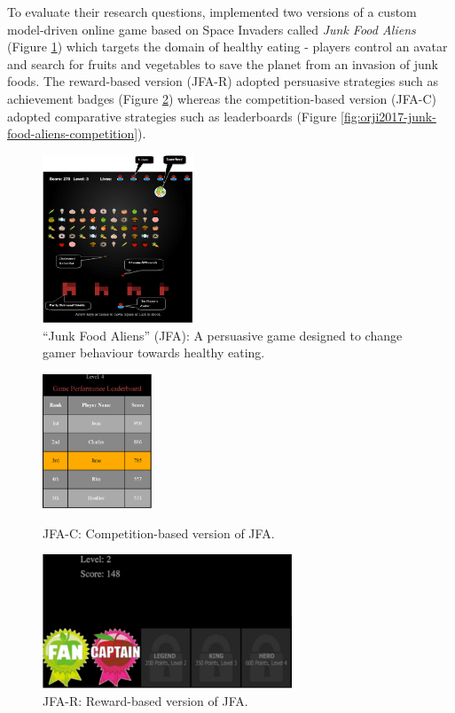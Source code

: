 \documentclass[11pt]{article}
\begin{document}
To evaluate their research questions, \citeauthor{orji2017} implemented two versions of a custom model-driven online game based on Space Invaders called \textit{Junk Food Aliens} (Figure \ref{fig:orji2017-junk-food-aliens}) which targets the domain of healthy eating - players control an avatar and search for fruits and vegetables to save the planet from an invasion of junk foods. The reward-based version (JFA-R) adopted persuasive strategies such as achievement badges (Figure \ref{fig:orji2017-junk-food-aliens-reward}) whereas the competition-based version (JFA-C) adopted comparative strategies such as leaderboards (Figure \ref{fig:orji2017-junk-food-aliens-competition}). 

\begin{figure}[H]
\centering
\includegraphics[width=0.4\textwidth]{img/orji2017-junk-food-aliens.png} 
\caption{``Junk Food Aliens'' (JFA): A persuasive game designed to change gamer behaviour towards healthy eating.}\label{fig:orji2017-junk-food-aliens}
\end{figure}

\begin{figure}[H]
\centering
  \includegraphics[height=4cm]{img/orji2017-junk-food-aliens-competition.png}
  \caption{JFA-C: Competition-based version of JFA.}\label{fig:orji2017-junk-food-aliens-competition}
\endminipage\hfill
{}%
\centering
  \includegraphics[height=4cm]{img/orji2017-junk-food-aliens-reward.png}
  \caption{JFA-R: Reward-based version of JFA.}\label{fig:orji2017-junk-food-aliens-reward}
\endminipage
\end{figure}
\end{document}
